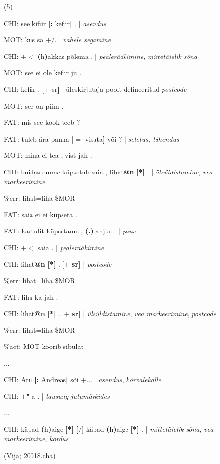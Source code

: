 \documentclass[12pt]{article}
\begin{document}
(5)
\begin{description}
    \item*CHI:   see kifiir \textbf{[:} kefiir\textbf{]} . | \emph{asendus}
    \item*MOT:   kus sa $\pmb{+/}$. | \emph{vahele segamine}
    \item*CHI:   $\pmb{+<}$ \textbf{(}h\textbf{)}akkas põlema . | \emph{pealerääkimine}, \emph{mittetäielik sõna}
    \item*MOT:   see ei ole kefiir ju .
    \item*CHI:   kefiir . $\pmb{[+}$ sr\textbf{]} | üleskirjutaja poolt defineeritud \emph{postcode}
    \item*MOT:   see on piim .
    \item*FAT:   mis see kook teeb ?
    \item*FAT:   tuleb ära panna $\pmb{[=}$ visata\textbf{]} või ? | \emph{seletus, tähendus}
    \item*MOT:   mina ei tea , vist jah .
    \item*CHI:   kuidas emme küpsetab saia , lihat\textbf{@n} \textbf{[*]} . | \emph{üleüldistamine}, \emph{vea markeerimine}
    \item\%err:   lihat=liha \$MOR
    \item*FAT:   saia ei ei küpseta .
    \item*FAT:   kartulit küpsetame , \textbf{(.)} ahjus . | \emph{paus}
    \item*CHI:   $\pmb{+<}$ saia . | \emph{pealerääkimine}
    \item*CHI:   lihat\textbf{@n} \textbf{[*]} . $\pmb{[+}$ \textbf{sr]} | \emph{postcode}
    \item\%err:   lihat=liha \$MOR
    \item*FAT:   liha ka jah .
    \item*CHI:   lihat\textbf{@n} \textbf{[*]} . $\pmb{[+}$ \textbf{sr]} | \emph{üleüldistamine}, \emph{vea markeerimine}, \emph{postcode}
    \item\%err:   lihat=liha \$MOR
    \item\%act:   MOT koorib sibulat
    \item...
    \item*CHI:   Atu \textbf{[:} Andreas\textbf{]} sõi $\pmb{+...}$ | \emph{asendus}, \emph{kõrvalekalle}
    \item*CHI:   $\pmb{+}$\textbf{"} a . | \emph{lausung jutumärkides}
    \item...
    \item*CHI:   käpad \textbf{(}h\textbf{)}aige \textbf{[*]} \textbf{[$\pmb{/]}$} käpad \textbf{(}h\textbf{)}aige \textbf{[*]} . | \emph{mittetäielik sõna}, \emph{vea markeerimine}, \emph{kordus}
    \item (Vija; 20018.cha)
\end{description}
\end{document}
